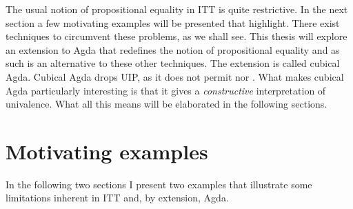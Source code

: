 The usual notion of propositional equality in ITT is quite
restrictive.  In the next section a few motivating examples will be
presented that highlight.  There exist techniques to circumvent these
problems, as we shall see.  This thesis will explore an extension to
Agda that redefines the notion of propositional equality and as such
is an alternative to these other techniques.  The extension is called
cubical Agda.  Cubical Agda drops UIP, as it does not permit
 nor .
What makes cubical Agda particularly interesting is that it gives a
\emph{constructive} interpretation of univalence.  What all this means
will be elaborated in the following sections.
%
\section{Motivating examples}
%
In the following two sections I present two examples that illustrate
some limitations inherent in ITT and, by extension, Agda.
%
